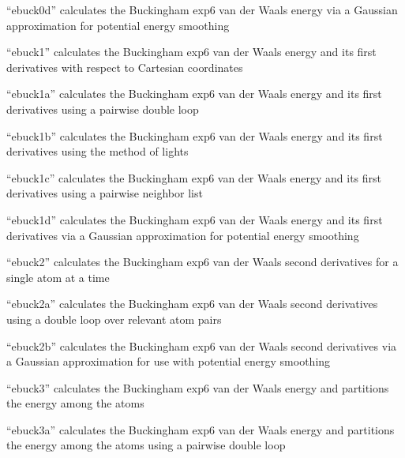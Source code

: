\documentclass[letterpaper,11pt,english]{sphinxmanual}
\begin{document}
“ebuck0d” calculates the Buckingham exp\sphinxhyphen{}6 van der Waals energy
via a Gaussian approximation for potential energy smoothing


“ebuck1” calculates the Buckingham exp\sphinxhyphen{}6 van der Waals energy
and its first derivatives with respect to Cartesian coordinates


“ebuck1a” calculates the Buckingham exp\sphinxhyphen{}6 van der Waals energy
and its first derivatives using a pairwise double loop


“ebuck1b” calculates the Buckingham exp\sphinxhyphen{}6 van der Waals energy
and its first derivatives using the method of lights


“ebuck1c” calculates the Buckingham exp\sphinxhyphen{}6 van der Waals energy
and its first derivatives using a pairwise neighbor list


“ebuck1d” calculates the Buckingham exp\sphinxhyphen{}6 van der Waals energy
and its first derivatives via a Gaussian approximation for
potential energy smoothing


“ebuck2” calculates the Buckingham exp\sphinxhyphen{}6 van der Waals
second derivatives for a single atom at a time


“ebuck2a” calculates the Buckingham exp\sphinxhyphen{}6 van der Waals second
derivatives using a double loop over relevant atom pairs


“ebuck2b” calculates the Buckingham exp\sphinxhyphen{}6 van der Waals second
derivatives via a Gaussian approximation for use with potential
energy smoothing


“ebuck3” calculates the Buckingham exp\sphinxhyphen{}6 van der Waals energy
and partitions the energy among the atoms


“ebuck3a” calculates the Buckingham exp\sphinxhyphen{}6 van der Waals
energy and partitions the energy among the atoms using
a pairwise double loop
\end{document}
